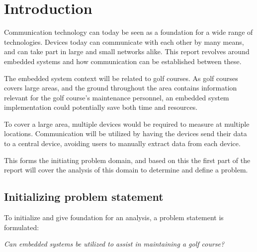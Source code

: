 \chapter{Introduction}
Communication technology can today be seen as a foundation for a wide range of technologies. Devices today can communicate with each other by many means, and can take part in large and small networks alike. This report revolves around embedded systems and how communication can be established between these.

The embedded system context will be related to golf courses. As golf courses covers large areas, and the ground throughout the area contains information relevant for the golf course's maintenance personnel, an embedded system implementation could potentially save both time and resources. 

To cover a large area, multiple devices would be required to measure at multiple locations. Communication will be utilized by having the devices send their data to a central device, avoiding users to manually extract data from each device.

This forms the initiating problem domain, and based on this the first part of the report will cover the analysis of this domain to determine and define a problem.


\section*{Initializing problem statement}
To initialize and give foundation for an analysis, a problem statement is formulated:

\textit{Can embedded systems be utilized to assist in maintaining a golf course?}